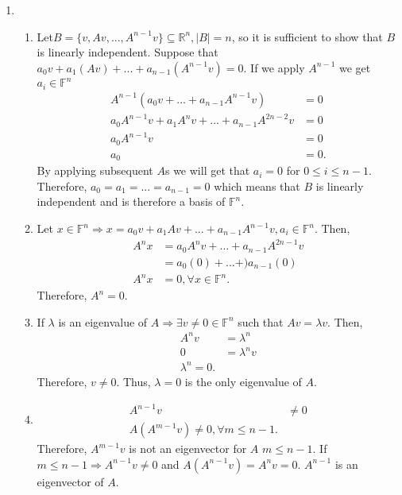 \documentclass{article}
\begin{document}
\begin{enumerate}
    \item
    
    \begin{enumerate}
        \item 
        
        Let$B=\{v, Av, ..., A^{n-1}v\}\subseteq\mathbb{R}^n, |B|=n$, so it is sufficient to show that $B$ is linearly independent. Suppose that $a_0v+a_1(Av)+...+a_{n-1}(A^{n-1}v)=0$. If we apply $A^{n-1}$ we get $a_i \in \mathbb{F}^n$
        \begin{align*}
            A^{n-1}(a_0v+...+a_{n-1}A^{n-1}v)&=0\\
            a_0A^{n-1}v+a_1A^nv+...+a_{n-1}A^{2n-2}v&=0\\
            a_0A^{n-1}v&=0\\
            a_0&=0.
        \end{align*} By applying subsequent $A$s we will get that $a_i=0$ for $0\leq i\leq n-1$. Therefore, $a_0=a_1=...=a_{n-1}=0$ which means that $B$ is linearly independent and is therefore a basis of $\mathbb{F}^n$.
        
        \item
        
        Let $x\in\mathbb{F}^n\Rightarrow x=a_0v+a_1Av+...+a_{n-1}A^{n-1}v, a_i\in\mathbb{F}^n.$ Then, \begin{align*}
            A^nx &= a_0A^nv+...+a_{n-1}A^{2n-1}v\\
            &=a_0(0)+...+)a_{n-1}(0)\\
            A^nx&=0, \forall x\in \mathbb{F}^n.
        \end{align*} Therefore, $A^n=0.$
        
        \item
        
        If $\lambda$ is an eigenvalue of $A\Rightarrow \exists v\neq0\in\mathbb{F}^n$ such that $Av=\lambda v$. Then,
        \begin{align*}
            A^nv&=\lambda^n\\
             0&=\lambda^n v\\
             \lambda ^n=0.
        \end{align*} Therefore, $v\neq 0.$ Thus, $\lambda=0$ is the only eigenvalue of $A$.
        
        \item
        
        \begin{align*}
        A^{n-1}v&\neq 0\\
        A(A^{m-1}v)\neq0, \forall m\leq n-1.
        \end{align*} Therefore, $A^{m-1}v$ is not an eigenvector for $A$ $m\leq n-1.$ If $m\leq n-1 \Rightarrow A^{n-1}v\neq 0$ and $A(A^{n-1}v)=A^nv=0.$ $A^{n-1}$ is an eigenvector of $A$. 
        

\end{enumerate}
\end{enumerate}
\end{document}
